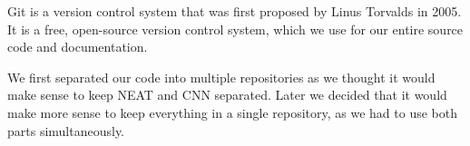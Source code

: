 Git is a version control system that was first proposed by Linus Torvalds in 2005. \cite{Torvalds} \\
It is a free, open-source version control system, which we use for our entire source code and documentation.

We first separated our code into multiple repositories \cite{gitrepo} as we thought it would make sense to keep NEAT and CNN separated. Later we decided that it would make more sense to keep everything in a single repository, as we had to use both parts simultaneously.
